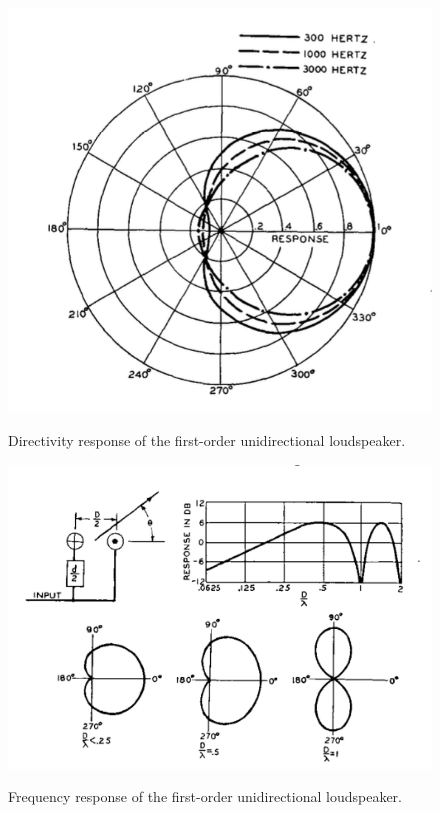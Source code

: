 \documentclass{report}
\begin{document}
        \begin{figure}[H]
            \centering
            \begin{minipage}{.4\textwidth}
                \includegraphics[width=\linewidth]{figs/olsonFirstOrderDirectivity.png}
                \caption{Directivity response of the first-order unidirectional loudspeaker.}\cite{olson1973gradient}
                \label{olsonFirstOrderDirectivity}
            \end{minipage}
            \begin{minipage}{.55\textwidth}
                \includegraphics[width=\linewidth]{figs/olsonFreqResponse.png}
                \caption{Frequency response of the first-order unidirectional loudspeaker.}\cite{olson1973gradient}
                \label{olsonFreqResponse}
            \end{minipage}
        \end{figure}
\end{document}

